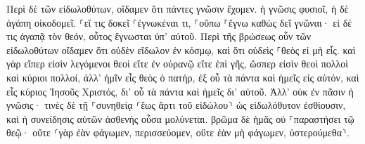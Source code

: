 \documentclass{openreader}
\begin{document}
Περὶ δὲ τῶν εἰδωλοθύτων, οἴδαμεν ὅτι πάντες γνῶσιν ἔχομεν. ἡ γνῶσις φυσιοῖ, ἡ δὲ ἀγάπη οἰκοδομεῖ. 
⸀εἴ τις δοκεῖ ⸀ἐγνωκέναι τι, ⸀οὔπω ⸀ἔγνω καθὼς δεῖ γνῶναι· 
εἰ δέ τις ἀγαπᾷ τὸν θεόν, οὗτος ἔγνωσται ὑπ’ αὐτοῦ. 
Περὶ τῆς βρώσεως οὖν τῶν εἰδωλοθύτων οἴδαμεν ὅτι οὐδὲν εἴδωλον ἐν κόσμῳ, καὶ ὅτι οὐδεὶς ⸀θεὸς εἰ μὴ εἷς. 
καὶ γὰρ εἴπερ εἰσὶν λεγόμενοι θεοὶ εἴτε ἐν οὐρανῷ εἴτε ἐπὶ γῆς, ὥσπερ εἰσὶν θεοὶ πολλοὶ καὶ κύριοι πολλοί, 
ἀλλ’ ἡμῖν εἷς θεὸς ὁ πατήρ, ἐξ οὗ τὰ πάντα καὶ ἡμεῖς εἰς αὐτόν, καὶ εἷς κύριος Ἰησοῦς Χριστός, δι’ οὗ τὰ πάντα καὶ ἡμεῖς δι’ αὐτοῦ. 
Ἀλλ’ οὐκ ἐν πᾶσιν ἡ γνῶσις· τινὲς δὲ τῇ ⸀συνηθείᾳ ⸂ἕως ἄρτι τοῦ εἰδώλου⸃ ὡς εἰδωλόθυτον ἐσθίουσιν, καὶ ἡ συνείδησις αὐτῶν ἀσθενὴς οὖσα μολύνεται. 
βρῶμα δὲ ἡμᾶς οὐ ⸀παραστήσει τῷ θεῷ· οὔτε ⸂γὰρ ἐὰν φάγωμεν, περισσεύομεν, οὔτε ἐὰν μὴ φάγωμεν, ὑστερούμεθα⸃. 
\end{document}
